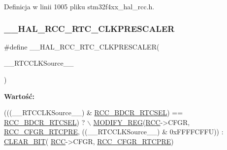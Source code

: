 Definicja w linii 1005 pliku stm32f4xx\+\_\+hal\+\_\+rcc.\+h.

\mbox{\label{group___r_c_c___internal___r_t_c___clock___configuration_ga7e10e306e7d9f3cd59d30dcb2c9cf61d}} 
\subsubsection{\texorpdfstring{\+\_\+\+\_\+\+H\+A\+L\+\_\+\+R\+C\+C\+\_\+\+R\+T\+C\+\_\+\+C\+L\+K\+P\+R\+E\+S\+C\+A\+L\+ER}{\_\_HAL\_RCC\_RTC\_CLKPRESCALER}}
{\footnotesize\ttfamily \#define \+\_\+\+\_\+\+H\+A\+L\+\_\+\+R\+C\+C\+\_\+\+R\+T\+C\+\_\+\+C\+L\+K\+P\+R\+E\+S\+C\+A\+L\+ER(\begin{DoxyParamCaption}\item[{}]{\+\_\+\+\_\+\+R\+T\+C\+C\+L\+K\+Source\+\_\+\+\_\+ }\end{DoxyParamCaption})}

{\bfseries Wartość\+:}
\begin{DoxyCode}
(((\_\_RTCCLKSource\_\_) & \hyperlink{group___peripheral___registers___bits___definition_gabe30dbd38f6456990ee641648bc05d40}{RCC\_BDCR\_RTCSEL}) == \hyperlink{group___peripheral___registers___bits___definition_gabe30dbd38f6456990ee641648bc05d40}{RCC\_BDCR\_RTCSEL}) ?    \(\backslash\)
                                                 \hyperlink{group___exported__macro_ga6553c99f510c3bab8cc0a91602053247}{MODIFY\_REG}(\hyperlink{group___peripheral__declaration_ga74944438a086975793d26ae48d5882d4}{RCC}->CFGR, 
      \hyperlink{group___peripheral___registers___bits___definition_gad7c067c52ecd135252c691aad32c0b83}{RCC\_CFGR\_RTCPRE}, ((\_\_RTCCLKSource\_\_) & 0xFFFFCFFU)) : \hyperlink{group___exported__macro_ga133aae6fc0d41bffab39ab223a7001de}{CLEAR\_BIT}(
      \hyperlink{group___peripheral__declaration_ga74944438a086975793d26ae48d5882d4}{RCC}->CFGR, \hyperlink{group___peripheral___registers___bits___definition_gad7c067c52ecd135252c691aad32c0b83}{RCC\_CFGR\_RTCPRE})
\end{DoxyCode}


